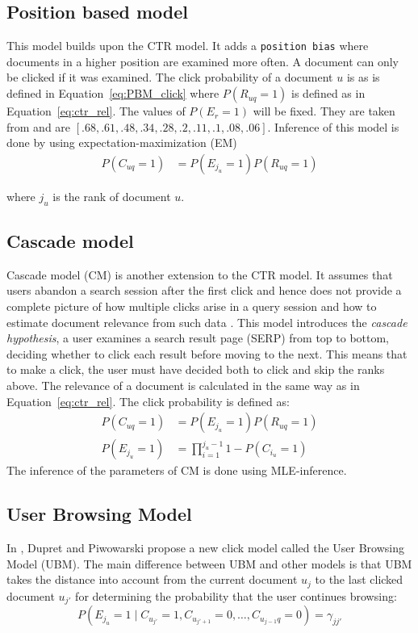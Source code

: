 \subsection{Position based model}
This model builds upon the CTR model. It adds a \texttt{position bias} where documents in a higher position are examined more often. A document can only be clicked if it was examined. The click probability of a document $u$ is as is defined in Equation~\ref{eq:PBM_click} where $P(R_{uq}=1)$ is defined as in Equation~\ref{eq:ctr_rel}. The values of $P(E_r=1)$ will be fixed. They are taken from \cite{eye_track} and are $[.68, .61, .48, .34, .28, .2, .11, .1, .08, .06]$. Inference of this model is done by using expectation-maximization (EM)
\begin{align}
	P(C_{uq}=1) &= P(E_{j_u}=1)P(R_{uq}=1) \label{eq:PBM_click}
\end{align}

where $j_u$ is the rank of document $u$.

\subsection{Cascade model}
Cascade model (CM) is another extension to the CTR model. It assumes that users abandon a search session after the first click and hence does not provide a complete picture of how multiple clicks arise in a query session and how to estimate document relevance from such data \cite{Kempe2008,Craswell2008}. This model introduces the \textit{cascade hypothesis}, a user examines a search result page (SERP) from top to bottom, deciding whether to click each result before moving to the next. This means that to make a click, the user must have decided both to click and skip the ranks above. The relevance of a document is calculated in the same way as in Equation~\ref{eq:ctr_rel}. The click probability is defined as:
\begin{align}
	P(C_{uq}=1) &= P(E_{j_u}=1)P(R_{uq}=1) \label{eq:CM_click} \\
	P(E_{j_u}=1) &= \prod_{i=1}^{j_u-1} 1 - P(C_{i_u}=1) \nonumber
\end{align}
The inference of the parameters of CM is done using MLE-inference.

\subsection{User Browsing Model}
In \cite{Dupret2008}, Dupret and Piwowarski propose a new click model called the User Browsing Model (UBM). The main difference between UBM and other models is that UBM takes the distance into account from the current document \(u_j\) to the last clicked document \(u_{j'}\) for determining the probability that the user continues browsing:
\[P(E_{j_u} = 1 \mid C_{u_{j'}}=1, C_{u_{j'+1}}=0, \dots, C_{u_{j-1}q}=0) = \gamma_{jj'}\]

